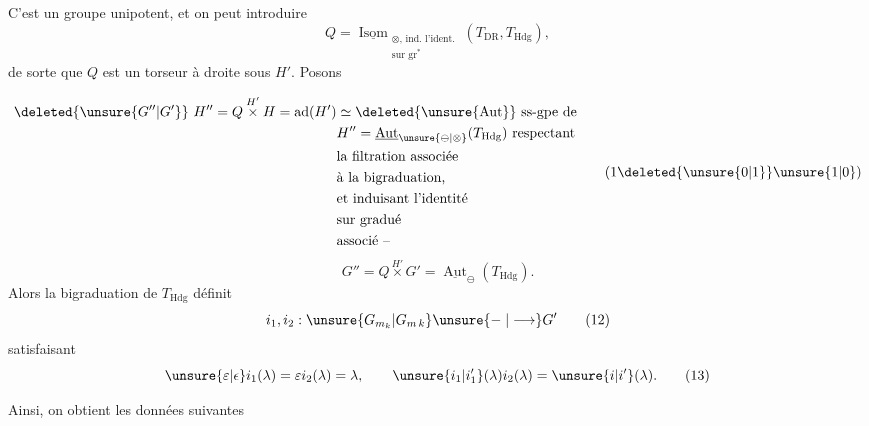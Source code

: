 \begingroup\makeatletter\tagsleft@true\makeatother
C'est un groupe unipotent, et on peut introduire
\[
Q=\underline{\operatorname{Isom}}_{\substack{\otimes,\,\text{ind. l'ident.}\\\text{sur }\operatorname{gr}^{*}}}(T_{\mathrm{DR}},T_{\mathrm{Hdg}}),\tag*{(9)}
\]
de sorte que $Q$ est un torseur à droite sous $H'$. Posons

\reversemarginpar
{}
\normalmarginpar
\[
\begin{aligned}
\deleted{\unsure{G''|G'}}\ H''=Q\overset{H'}{\times}H=\operatorname{ad}(H')&\simeq\deleted{\unsure{\operatorname{Aut}}}\ \text{ss-gpe de}\\
&H''=\underline{\operatorname{Aut}}_{\unsure{\ominus|\otimes}}(T_{\mathrm{Hdg}})\ \text{respectant}\\
&\text{la filtration associée}\\
&\text{à la bigraduation,}\\
&\text{et induisant l'identité}\\
&\text{sur gradué}\\
&\text{associé --}
\end{aligned}\tag*{(1\deleted{\unsure{0|1}}\unsure{1|0})}
\]
\[
G''=Q\overset{H'}{\times}G'=\underline{\operatorname{Aut}}_{\ominus}(T_{\mathrm{Hdg}}).\tag*{(10)}
\]
Alors la bigraduation de $T_{\mathrm{Hdg}}$ définit
\[
i_1,i_2:\unsure{G_{m_k}|G_{m\,k}}\unsure{\relbar|\longrightarrow}G'\tag*{(12)}
\]
satisfaisant
\[
\unsure{\varepsilon|\epsilon}i_1(\lambda)=\varepsilon i_2(\lambda)=\lambda,\qquad \unsure{i_1|i'_1}(\lambda)i_2(\lambda)=\unsure{i|i'}(\lambda).\tag*{(13)}
\]

Ainsi, on obtient les données suivantes

